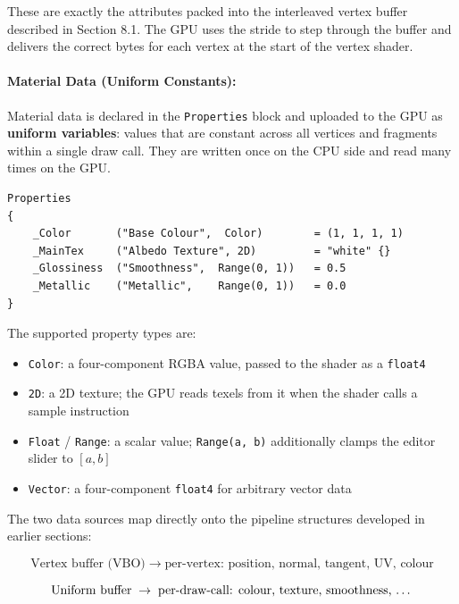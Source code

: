 \documentclass[11pt]{article}
\begin{document}
These are exactly the attributes packed into the interleaved vertex buffer described in Section 8.1. The GPU uses the stride to step through the buffer and delivers the correct bytes for each vertex at the start of the vertex shader.

\paragraph{Material Data (Uniform Constants):}

Material data is declared in the \texttt{Properties} block and uploaded to the GPU as \textbf{uniform variables}: values that are constant across all vertices and fragments within a single draw call. They are written once on the CPU side and read many times on the GPU.

\begin{lstlisting}
Properties
{
    _Color       ("Base Colour",  Color)        = (1, 1, 1, 1)
    _MainTex     ("Albedo Texture", 2D)         = "white" {}
    _Glossiness  ("Smoothness",  Range(0, 1))   = 0.5
    _Metallic    ("Metallic",    Range(0, 1))   = 0.0
}
\end{lstlisting}

The supported property types are:

\begin{itemize}
    \item \texttt{Color}: a four-component RGBA value, passed to the shader as a \texttt{float4}
    \item \texttt{2D}: a 2D texture; the GPU reads texels from it when the shader calls a sample instruction
    \item \texttt{Float} / \texttt{Range}: a scalar value; \texttt{Range(a, b)} additionally clamps the editor slider to $[a, b]$
    \item \texttt{Vector}: a four-component \texttt{float4} for arbitrary vector data
\end{itemize}

The two data sources map directly onto the pipeline structures developed in earlier sections:

\begin{equation}
    \text{Vertex buffer (VBO)} \;\rightarrow\; \text{per-vertex: position, normal, tangent, UV, colour}
\end{equation}

\begin{equation}
    \text{Uniform buffer} \;\rightarrow\; \text{per-draw-call: colour, texture, smoothness, \dots}
\end{equation}
\end{document}

